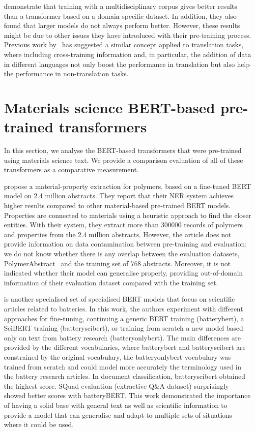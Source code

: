 \cite{hong2022ScholarBERT} demonstrate that training with a multidisciplinary corpus gives better results than a transformer based on a domain-specific dataset. In addition, they also found that larger models do not always perform better. However, these results might be due to other issues they have introduced with their pre-training process. 
Previous work by~\cite{lample2019cross} has suggested a similar concept applied to translation tasks, where including cross-training information and, in particular, the addition of data in different languages not only boost the performance in translation but also help the performance in non-translation tasks. 


\section{Materials science BERT-based pre-trained transformers}

In this section, we analyse the BERT-based transformers that were pre-trained using materials science text. We provide a comparison evaluation of all of these transformers as a comparative measurement. 

\cite{pranav2023a} propose a material-property extraction for polymers, based on a fine-tuned BERT model on 2.4 million abstracts. They report that their NER system achieves higher results compared to other material-based pre-trained BERT models. Properties are connected to materials using a heuristic approach to find the closer entities.
With their system, they extract more than 300000 records of polymers and properties from the 2.4 million abstracts. 
However, the article does not provide information on data contamination between pre-training and evaluation: we do not know whether there is any overlap between the evaluation datasets, PolymerAbstract~\cite{huan2016a} and the training set of 768 abstracts. 
Moreover, it is not indicated whether their model can generalise properly, providing out-of-domain information of their evaluation dataset compared with the training set. 

\cite{huang2020batterybert} is another specialised set of specialised BERT models that focus on scientific articles related to batteries. In this work, the authors experiment with different approaches for fine-tuning, continuing a generic BERT training (batterybert), a SciBERT training (batteryscibert), or training from scratch a new model based only on text from battery research (batteryonlybert). The main differences are provided by the different vocabularies, where batterybert and batteryscibert are constrained by the original vocabulary, the batteryonlybert vocabulary was trained from scratch and could model more accurately the terminology used in the battery research articles. 
In document classification, batteryscibert obtained the highest score. SQuad evaluation (extractive Q\&A dataset) surprisingly showed better scores with batteryBERT. This work demonstrated the importance of having a solid base with general text as well as scientific information to provide a model that can generalise and adapt to multiple sets of situations where it could be used. 

